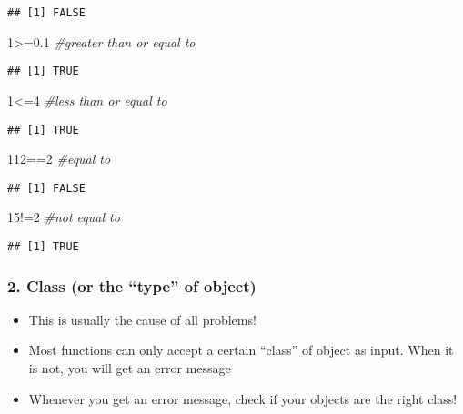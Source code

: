 \documentclass[]{article}
\newenvironment{Shaded}{\begin{snugshade}}{\end{snugshade}}
\newcommand{\DecValTok}[1]{\textcolor[rgb]{0.00,0.00,0.81}{{#1}}}
\newcommand{\FloatTok}[1]{\textcolor[rgb]{0.00,0.00,0.81}{{#1}}}
\newcommand{\CommentTok}[1]{\textcolor[rgb]{0.56,0.35,0.01}{\textit{{#1}}}}
\newcommand{\NormalTok}[1]{{#1}}
\providecommand{\tightlist}{%
  \setlength{\itemsep}{0pt}\setlength{\parskip}{0pt}}
\begin{document}
\begin{verbatim}
## [1] FALSE
\end{verbatim}

\begin{Shaded}
\begin{Highlighting}[]
\DecValTok{1}\NormalTok{>=}\FloatTok{0.1} \CommentTok{#greater than or equal to}
\end{Highlighting}
\end{Shaded}

\begin{verbatim}
## [1] TRUE
\end{verbatim}

\begin{Shaded}
\begin{Highlighting}[]
\DecValTok{1}\NormalTok{<=}\DecValTok{4} \CommentTok{#less than or equal to}
\end{Highlighting}
\end{Shaded}

\begin{verbatim}
## [1] TRUE
\end{verbatim}

\begin{Shaded}
\begin{Highlighting}[]
\DecValTok{112}\NormalTok{==}\DecValTok{2} \CommentTok{#equal to}
\end{Highlighting}
\end{Shaded}

\begin{verbatim}
## [1] FALSE
\end{verbatim}

\begin{Shaded}
\begin{Highlighting}[]
\DecValTok{15}\NormalTok{!=}\DecValTok{2} \CommentTok{#not equal to}
\end{Highlighting}
\end{Shaded}

\begin{verbatim}
## [1] TRUE
\end{verbatim}

\subsubsection{\texorpdfstring{2. Class (or the ``type'' of
object)}{2. Class (or the type of object)}}\label{class-or-the-type-of-object}

\begin{itemize}
\tightlist
\item
  This is usually the cause of all problems!
\item
  Most functions can only accept a certain ``class'' of object as input.
  When it is not, you will get an error message
\item
  Whenever you get an error message, check if your objects are the right
  class!
\end{itemize}
\end{document}
